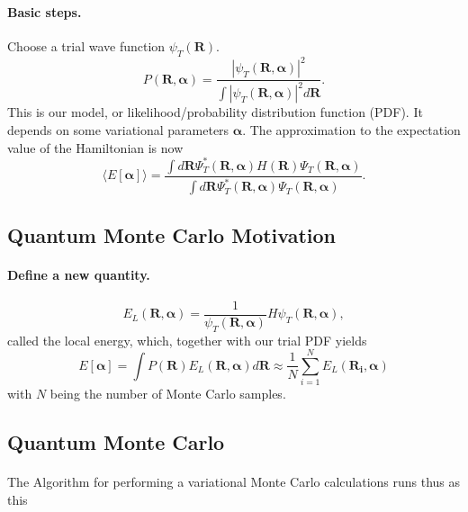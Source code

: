 \documentclass[%
oneside,                 %
final,                   %
10pt]{article}
\begin{document}
\paragraph{Basic steps.}
Choose a trial wave function
$\psi_T(\bm{R})$.
\[
   P(\bm{R},\bm{\alpha})= \frac{\left|\psi_T(\bm{R},\bm{\alpha})\right|^2}{\int \left|\psi_T(\bm{R},\bm{\alpha})\right|^2d\bm{R}}.
\]
This is our model, or likelihood/probability distribution function  (PDF). It depends on some variational parameters $\bm{\alpha}$.
The approximation to the expectation value of the Hamiltonian is now 
\[
   \langle E[\bm{\alpha}] \rangle = 
   \frac{\int d\bm{R}\Psi^{\ast}_T(\bm{R},\bm{\alpha})H(\bm{R})\Psi_T(\bm{R},\bm{\alpha})}
        {\int d\bm{R}\Psi^{\ast}_T(\bm{R},\bm{\alpha})\Psi_T(\bm{R},\bm{\alpha})}.
\]




\subsection{Quantum Monte Carlo Motivation}

\paragraph{Define a new quantity.}
\[
   E_L(\bm{R},\bm{\alpha})=\frac{1}{\psi_T(\bm{R},\bm{\alpha})}H\psi_T(\bm{R},\bm{\alpha}),
\]
called the local energy, which, together with our trial PDF yields
\[
  E[\bm{\alpha}]=\int P(\bm{R})E_L(\bm{R},\bm{\alpha}) d\bm{R}\approx \frac{1}{N}\sum_{i=1}^NE_L(\bm{R_i},\bm{\alpha})
\]
with $N$ being the number of Monte Carlo samples.




\subsection{Quantum Monte Carlo}

\paragraph{}
The Algorithm for performing a variational Monte Carlo calculations runs thus as this
\end{document}
